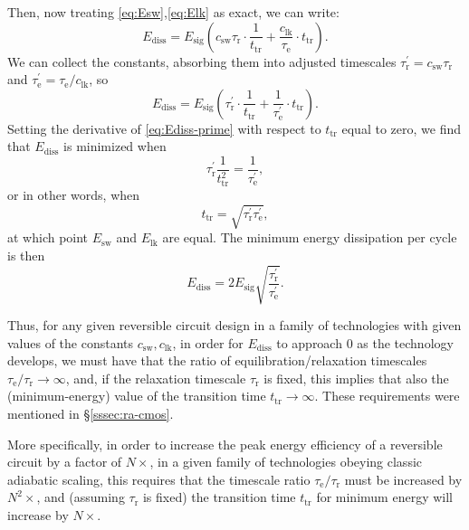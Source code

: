 \documentclass[preprints,article,accept,moreauthors,pdftex]{Definitions/mdpi}
\begin{document}
\begin{paracol}{2}
Then, now treating \eqref{eq:Esw},\eqref{eq:Elk} as exact, we can write:
\begin{equation}\label{eq:Ediss-ttr}
    E_\mathrm{diss} = E_\mathrm{sig} \left( c_\mathrm{sw}\tau_\mathrm{r}\cdot \frac{1}{t_\mathrm{tr}} + \frac{c_\mathrm{lk}}{\tau_\mathrm{e}}\cdot t_\mathrm{tr} \right).
\end{equation}
We can collect the constants, absorbing them into adjusted timescales $\tau_\mathrm{r}^\prime = c_\mathrm{sw}\tau_\mathrm{r}$ and $\tau_\mathrm{e}^\prime = \tau_\mathrm{e}/c_\mathrm{lk}$, so
\begin{equation}\label{eq:Ediss-prime}
    E_\mathrm{diss} = E_\mathrm{sig}\left( \tau_\mathrm{r}^\prime\cdot\frac{1}{t_\mathrm{tr}} + \frac{1}{\tau_\mathrm{e}^\prime}\cdot t_\mathrm{tr} \right).
\end{equation}
Setting the derivative of \eqref{eq:Ediss-prime} with respect to $t_\mathrm{tr}$ equal to zero, we find that $E_\mathrm{diss}$ is minimized when
\begin{equation}
    \tau_\mathrm{r}^\prime\frac{1}{t_\mathrm{tr}^2} =
    \frac{1}{\tau_\mathrm{e}^\prime},
\end{equation}
or in other words, when
\begin{equation}
    t_\mathrm{tr} = \sqrt{\tau_\mathrm{r}^\prime\tau_\mathrm{e}^\prime},
\end{equation}
at which point $E_\mathrm{sw}$ and $E_\mathrm{lk}$ are equal. The minimum energy dissipation per cycle is then
\begin{equation}
    E_\mathrm{diss}=2E_\mathrm{sig}\sqrt{\frac{\tau_\mathrm{r}^\prime}{\tau_\mathrm{e}^\prime}}.
\end{equation}

Thus, for any given reversible circuit design in a family of technologies with given values of the constants $c_\mathrm{sw},c_\mathrm{lk}$, in order for $E_\mathrm{diss}$ to approach 0 as the technology develops, we must have that the ratio of equilibration/relaxation timescales $\tau_\mathrm{e}/\tau_\mathrm{r}\rightarrow\infty$, and, if the relaxation timescale $\tau_\mathrm{r}$ is fixed, this implies that also the (minimum-energy) value of the transition time $t_\mathrm{tr}\rightarrow\infty$. These requirements were mentioned in \S\ref{sssec:ra-cmos}.

More specifically, in order to increase the peak energy efficiency of a reversible circuit by a factor of $N\times$, in a given family of technologies obeying classic adiabatic scaling, this requires that the timescale ratio $\tau_\mathrm{e}/\tau_\mathrm{r}$ must be increased by $N^2\times$, and (assuming $\tau_\mathrm{r}$ is fixed) the transition time $t_\mathrm{tr}$ for minimum energy will increase by $N\times$.


\end{paracol}
\end{document}
